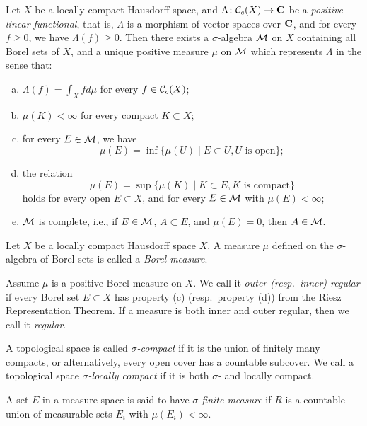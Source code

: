 \begin{theorem}
  Let $X$ be a locally compact Hausdorff space, and $\Lambda \colon \mathcal{C}_c(X) \rightarrow \mathbf{C}$ be a \emph{positive linear functional}, that is, $\Lambda$ is a morphism of vector spaces over $\mathbf{C}$, and for every $f \geq 0$, we have $\Lambda(f) \geq 0$. Then there exists a $\sigma$-algebra $\mathcal{M}$ on $X$ containing all Borel sets of $X$, and a unique positive measure $\mu$ on $\mathcal{M}$ which represents $\Lambda$ in the sense that:
  \begin{enumerate}[(a)]
  \item $\Lambda(f) = \int_X f d\mu$ for every $f \in \mathcal{C}_c(X)$;
  \item $\mu(K) < \infty$ for every compact $K \subset X$;
  \item for every $E \in \mathcal{M}$, we have
    \[
    \mu(E) = \inf\{ \mu(U) \;|\; E \subset U, U \textrm{ is open} \};
    \]
  \item the relation
    \[
    \mu(E) = \sup\{ \mu(K) \;|\; K \subset E, K \textrm{ is compact} \}
    \]
    holds for every open $E \subset X$, and for every $E \in \mathcal{M}$ with $\mu(E) < \infty$;
  \item $\mathcal{M}$ is complete, i.e., if $E \in \mathcal{M}$, $A \subset E$, and $\mu(E) = 0$, then $A \in \mathcal{M}$.
  \end{enumerate}
\end{theorem}

\begin{definition}
  Let $X$ be a locally compact Hausdorff space $X$. A measure $\mu$ defined on the $\sigma$-algebra of Borel sets is called a \emph{Borel measure}.
\end{definition}

\begin{definition}
  Assume $\mu$ is a positive Borel measure on $X$. We call it \emph{outer (resp.\ inner) regular} if every Borel set $E \subset X$ has property (c) (resp.\ property (d)) from the Riesz Representation Theorem. If a measure is both inner and outer regular, then we call it \emph{regular}.
\end{definition}

\begin{definition}
  A topological space is called \emph{$\sigma$-compact} if it is the union of finitely many compacts, or alternatively, every open cover has a countable subcover. We call a topological space \emph{$\sigma$-locally compact} if it is both $\sigma$- and locally compact.

  A set $E$ in a measure space is said to have \emph{$\sigma$-finite measure} if $R$ is a countable union of measurable sets $E_i$ with $\mu(E_i) < \infty$.
\end{definition}

